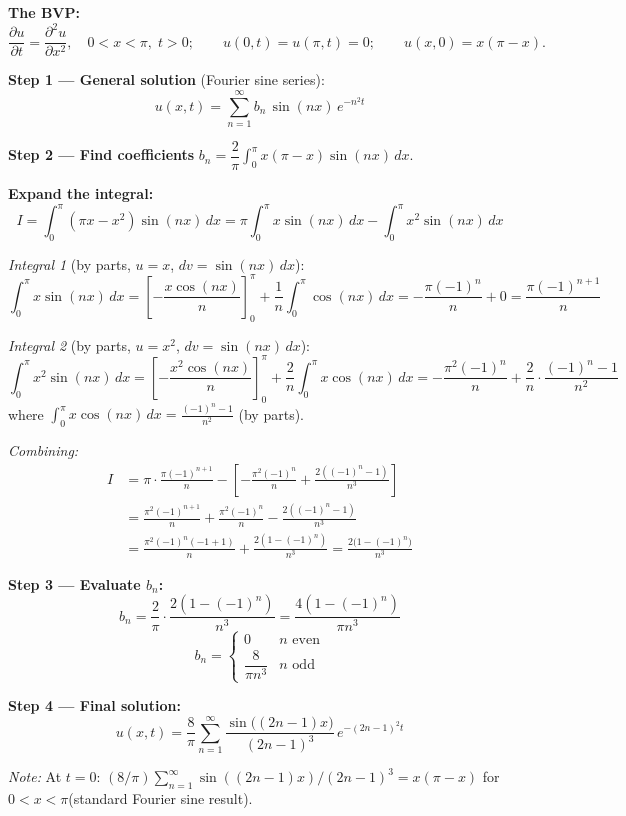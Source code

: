 \documentclass[12pt]{article}
\begin{document}
\begin{ansbox}
\textbf{The BVP:}
\[
  \frac{\partial u}{\partial t}=\frac{\partial^2 u}{\partial x^2},\quad 0<x<\pi,\;t>0;\qquad
  u(0,t)=u(\pi,t)=0;\qquad u(x,0)=x(\pi-x).
\]

\textbf{Step 1 — General solution} (Fourier sine series):
\[
  u(x,t)=\sum_{n=1}^{\infty}b_n\,\sin(nx)\,e^{-n^2 t}
\]

\textbf{Step 2 — Find coefficients} $b_n=\dfrac{2}{\pi}\displaystyle\int_0^{\pi}x(\pi-x)\sin(nx)\,dx$.

\textbf{Expand the integral:}
\[
  I=\int_0^{\pi}(\pi x-x^2)\sin(nx)\,dx
  =\pi\int_0^{\pi}x\sin(nx)\,dx-\int_0^{\pi}x^2\sin(nx)\,dx
\]

\textit{Integral 1} (by parts, $u=x$, $dv=\sin(nx)\,dx$):
\[
  \int_0^{\pi}x\sin(nx)\,dx
  =\left[-\frac{x\cos(nx)}{n}\right]_0^{\pi}+\frac{1}{n}\int_0^{\pi}\cos(nx)\,dx
  =-\frac{\pi(-1)^n}{n}+0=\frac{\pi(-1)^{n+1}}{n}
\]

\textit{Integral 2} (by parts, $u=x^2$, $dv=\sin(nx)\,dx$):
\[
  \int_0^{\pi}x^2\sin(nx)\,dx
  =\left[-\frac{x^2\cos(nx)}{n}\right]_0^{\pi}+\frac{2}{n}\int_0^{\pi}x\cos(nx)\,dx
  =-\frac{\pi^2(-1)^n}{n}+\frac{2}{n}\cdot\frac{(-1)^n-1}{n^2}
\]
where $\displaystyle\int_0^{\pi}x\cos(nx)\,dx=\frac{(-1)^n-1}{n^2}$ (by parts).

\textit{Combining:}
\begin{align*}
  I &= \pi\cdot\frac{\pi(-1)^{n+1}}{n}-\left[-\frac{\pi^2(-1)^n}{n}+\frac{2((-1)^n-1)}{n^3}\right]\\
    &= \frac{\pi^2(-1)^{n+1}}{n}+\frac{\pi^2(-1)^n}{n}-\frac{2((-1)^n-1)}{n^3}\\
    &= \frac{\pi^2(-1)^n(-1+1)}{n}+\frac{2(1-(-1)^n)}{n^3}
     = \frac{2\bigl(1-(-1)^n\bigr)}{n^3}
\end{align*}

\textbf{Step 3 — Evaluate $b_n$:}
\[
  b_n=\frac{2}{\pi}\cdot\frac{2(1-(-1)^n)}{n^3}=\frac{4(1-(-1)^n)}{\pi n^3}
\]
\[
  b_n=\begin{cases}0 & n\text{ even}\\[4pt]\dfrac{8}{\pi n^3} & n\text{ odd}\end{cases}
\]

\textbf{Step 4 — Final solution:}
\[
  \boxed{u(x,t)=\frac{8}{\pi}\sum_{n=1}^{\infty}\frac{\sin\bigl((2n-1)x\bigr)}{(2n-1)^3}\,e^{-(2n-1)^2 t}}
\]

\textit{Note:} At $t=0$: $(8/\pi)\sum_{n=1}^{\infty}\sin((2n-1)x)/(2n-1)^3 = x(\pi-x)$ for $0<x<\pi$\;\checkmark (standard Fourier sine result).
\end{ansbox}
\end{document}
